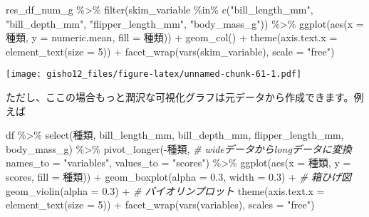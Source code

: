 \documentclass[
  xelatex,ja=standard, b5paper]{bxjsbook}
\newenvironment{Shaded}{\begin{snugshade}}{\end{snugshade}}
\newcommand{\AttributeTok}[1]{\textcolor[rgb]{0.77,0.63,0.00}{#1}}
\newcommand{\CommentTok}[1]{\textcolor[rgb]{0.56,0.35,0.01}{\textit{#1}}}
\newcommand{\DecValTok}[1]{\textcolor[rgb]{0.00,0.00,0.81}{#1}}
\newcommand{\FloatTok}[1]{\textcolor[rgb]{0.00,0.00,0.81}{#1}}
\newcommand{\FunctionTok}[1]{\textcolor[rgb]{0.00,0.00,0.00}{#1}}
\newcommand{\NormalTok}[1]{#1}
\newcommand{\SpecialCharTok}[1]{\textcolor[rgb]{0.00,0.00,0.00}{#1}}
\newcommand{\StringTok}[1]{\textcolor[rgb]{0.31,0.60,0.02}{#1}}
\begin{document}
\begin{Shaded}
\begin{Highlighting}[]
\NormalTok{res\_df\_num\_g }\SpecialCharTok{\%\textgreater{}\%} 
  \FunctionTok{filter}\NormalTok{(skim\_variable }\SpecialCharTok{\%in\%} \FunctionTok{c}\NormalTok{(}\StringTok{"bill\_length\_mm"}\NormalTok{, }\StringTok{"bill\_depth\_mm"}\NormalTok{,}
                             \StringTok{"flipper\_length\_mm"}\NormalTok{, }\StringTok{"body\_mass\_g"}\NormalTok{)) }\SpecialCharTok{\%\textgreater{}\%} 
  \FunctionTok{ggplot}\NormalTok{(}\FunctionTok{aes}\NormalTok{(}\AttributeTok{x =}\NormalTok{ 種類, }\AttributeTok{y =}\NormalTok{ numeric.mean, }\AttributeTok{fill =}\NormalTok{ 種類)) }\SpecialCharTok{+}
   \FunctionTok{geom\_col}\NormalTok{() }\SpecialCharTok{+}
    \FunctionTok{theme}\NormalTok{(}\AttributeTok{axis.text.x =} \FunctionTok{element\_text}\NormalTok{(}\AttributeTok{size =} \DecValTok{5}\NormalTok{)) }\SpecialCharTok{+}
   \FunctionTok{facet\_wrap}\NormalTok{(}\FunctionTok{vars}\NormalTok{(skim\_variable), }\AttributeTok{scale =} \StringTok{"free"}\NormalTok{)}
\end{Highlighting}
\end{Shaded}

\texttt{[image: gisho12\_files/figure-latex/unnamed-chunk-61-1.pdf]}

ただし、ここの場合もっと潤沢な可視化グラフは元データから作成できます。例えば

\begin{Shaded}
\begin{Highlighting}[]
\NormalTok{df }\SpecialCharTok{\%\textgreater{}\%} 
  \FunctionTok{select}\NormalTok{(種類, bill\_length\_mm, bill\_depth\_mm, flipper\_length\_mm,}
\NormalTok{         body\_mass\_g) }\SpecialCharTok{\%\textgreater{}\%} 
  \FunctionTok{pivot\_longer}\NormalTok{(}\SpecialCharTok{{-}}\NormalTok{種類,                  }\CommentTok{\# wideデータからlongデータに変換}
               \AttributeTok{names\_to =} \StringTok{"variables"}\NormalTok{,}
               \AttributeTok{values\_to =} \StringTok{"scores"}\NormalTok{) }\SpecialCharTok{\%\textgreater{}\%} 
  \FunctionTok{ggplot}\NormalTok{(}\FunctionTok{aes}\NormalTok{(}\AttributeTok{x =}\NormalTok{ 種類, }\AttributeTok{y =}\NormalTok{ scores, }\AttributeTok{fill =}\NormalTok{ 種類)) }\SpecialCharTok{+}
   \FunctionTok{geom\_boxplot}\NormalTok{(}\AttributeTok{alpha =} \FloatTok{0.3}\NormalTok{, }\AttributeTok{width =} \FloatTok{0.3}\NormalTok{) }\SpecialCharTok{+} \CommentTok{\# 箱ひげ図}
   \FunctionTok{geom\_violin}\NormalTok{(}\AttributeTok{alpha =} \FloatTok{0.3}\NormalTok{) }\SpecialCharTok{+}               \CommentTok{\# バイオリンプロット}
    \FunctionTok{theme}\NormalTok{(}\AttributeTok{axis.text.x =} \FunctionTok{element\_text}\NormalTok{(}\AttributeTok{size =} \DecValTok{5}\NormalTok{)) }\SpecialCharTok{+}
   \FunctionTok{facet\_wrap}\NormalTok{(}\FunctionTok{vars}\NormalTok{(variables), }\AttributeTok{scales =} \StringTok{"free"}\NormalTok{)}
\end{Highlighting}
\end{Shaded}
\end{document}
